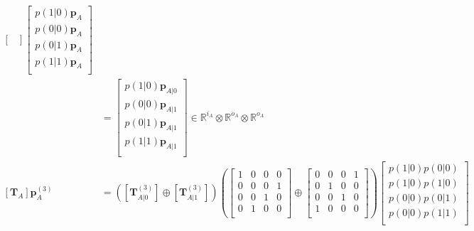 \documentclass[10pt, a4paper]{article}
\numberwithin{equation}{section} %
\theoremstyle{definition}
\theoremstyle{plain}
\newcommand{\?}{\mathrel{?}} %
\newcommand{\R}{\mathbb{R}} %
\newcommand{\cvec}[1]{\boldsymbol{\mathbf{#1}}}    %
\newcommand{\matr}[2][]{\left[\mathbf{#2}#1\right]} %
\begin{document}
\begin{align*}
\begin{bmatrix}
                                      \end{bmatrix}
                                      \begin{bmatrix} 
                                        p(1|0) \cvec{p}_A \\ p(0|0) \cvec{p}_A \\
                                        p(0|1) \cvec{p}_A \\ p(1|1) \cvec{p}_A \\ 
                                      \end{bmatrix} \\
                                      &=
                                      \begin{bmatrix} 
                                        p(1|0) \cvec{p}_{A|0} \\ p(0|0) \cvec{p}_{A|1} \\
                                        p(0|1) \cvec{p}_{A|1} \\ p(1|1) \cvec{p}_{A|1} \\ 
                                      \end{bmatrix} \in \R^{i_A} \otimes \R^{o_A} \otimes \R^{o_A} \\
                    \matr[_A]{T} \cvec{p}_A^{(3)} &= \left( \matr[_{A|0}^{(3)}]{T} \oplus \matr[_{A|1}^{(3)}]{T} \right)
                    \left(\begin{bmatrix}
                        1 & 0 & 0 & 0 \\
                        0 & 0 & 0 & 1 \\
                        0 & 0 & 1 & 0 \\
                        0 & 1 & 0 & 0 \\
                        \end{bmatrix} \oplus \begin{bmatrix}
                        0 & 0 & 0 & 1 \\
                        0 & 1 & 0 & 0 \\
                        0 & 0 & 1 & 0 \\
                        1 & 0 & 0 & 0 \\
                    \end{bmatrix}\right)
                    \begin{bmatrix} 
                      p(1|0) p(0|0) \\ p(1|0) p(1|0) \\ p(0|0) p(0|1) \\ p(0|0) p(1|1) \\

\end{bmatrix}
\end{align*}
\end{document}
